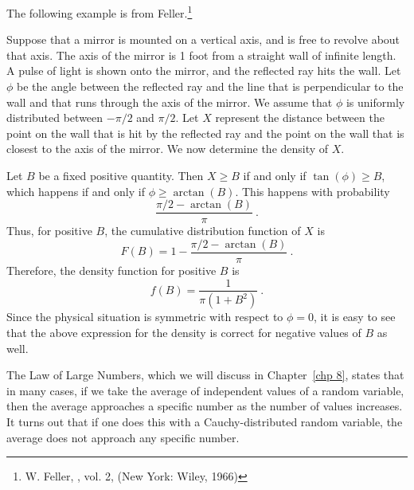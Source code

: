 The following example is from Feller.\footnote{W. Feller,  , vol. 2, (New York: Wiley, 1966)}
\begin{example}\label{exam 5.20.5}
Suppose that a mirror is mounted on a vertical axis, and is free to revolve about
that axis.  The axis of the mirror is 1 foot from a straight wall of infinite length.
A pulse of light is shown onto the mirror, and the reflected ray hits the wall.  Let
$\phi$ be the angle between the reflected ray and the line that is perpendicular to
the wall and that runs through the axis of the mirror.  We assume that $\phi$ is
uniformly distributed between
$-\pi/2$ and
$\pi/2$.  Let $X$ represent the distance between the point on the wall that is hit by
the reflected ray and the point on the wall that is closest to the axis of the
mirror.  We now determine the density of $X$.
\par
Let $B$ be a fixed positive quantity.  Then $X \ge B$ if and only if $\tan(\phi) \ge
B$, which happens if and only if $\phi \ge \arctan(B)$.  This happens with
probability 
$$\frac{\pi/2 - \arctan(B)}{\pi}\ .$$
Thus, for positive $B$, the cumulative distribution function of $X$ is
$$F(B) = 1 - \frac{\pi/2 - \arctan(B)}{\pi}\ .$$
Therefore, the density function for positive $B$ is
$$f(B) = \frac{1}{\pi (1 + B^2)}\ .$$
Since the physical situation is symmetric with respect to $\phi = 0$, it is easy to
see that the above expression for the density is correct for negative values of $B$
as well.  
\par
The Law of Large Numbers, which we will discuss in Chapter~\ref{chp 8}, states that
in many cases, if we take the average of independent values of a random variable, then
the average approaches a specific number as the number of values increases.  It turns
out that if one does this with a Cauchy-distributed random variable, the average does
not approach any specific number.
\end{example}

